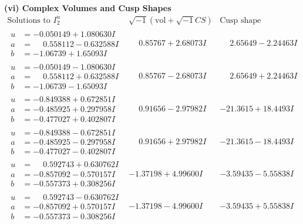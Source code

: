 \documentclass[1p]{elsarticle_modified}
\theoremstyle{definition}
\newcommand{\I}{\sqrt{-1}}
\begin{document}
\newpage\flushleft \textbf{(vi) Complex Volumes and Cusp Shapes}
$$\begin{array}{c|c|c}  
\text{Solutions to }I^u_{2}& \I (\text{vol} + \sqrt{-1}CS) & \text{Cusp shape}\\
 \hline 
\begin{aligned}
u &= -0.050149 + 1.080630 I \\
a &= \phantom{-}0.558112 - 0.632588 I \\
b &= -1.06739 + 1.65093 I\end{aligned}
 & \phantom{-}0.85767 + 2.68073 I & \phantom{-}2.65649 - 2.24463 I \\ \hline\begin{aligned}
u &= -0.050149 - 1.080630 I \\
a &= \phantom{-}0.558112 + 0.632588 I \\
b &= -1.06739 - 1.65093 I\end{aligned}
 & \phantom{-}0.85767 - 2.68073 I & \phantom{-}2.65649 + 2.24463 I \\ \hline\begin{aligned}
u &= -0.849388 + 0.672851 I \\
a &= -0.485925 + 0.297958 I \\
b &= -0.477027 + 0.402807 I\end{aligned}
 & \phantom{-}0.91656 - 2.97982 I & -21.3615 + 18.4493 I \\ \hline\begin{aligned}
u &= -0.849388 - 0.672851 I \\
a &= -0.485925 - 0.297958 I \\
b &= -0.477027 - 0.402807 I\end{aligned}
 & \phantom{-}0.91656 + 2.97982 I & -21.3615 - 18.4493 I \\ \hline\begin{aligned}
u &= \phantom{-}0.592743 + 0.630762 I \\
a &= -0.857092 - 0.570157 I \\
b &= -0.557373 + 0.308256 I\end{aligned}
 & -1.37198 + 4.99600 I & -3.59435 - 5.55838 I \\ \hline\begin{aligned}
u &= \phantom{-}0.592743 - 0.630762 I \\
a &= -0.857092 + 0.570157 I \\
b &= -0.557373 - 0.308256 I\end{aligned}
 & -1.37198 - 4.99600 I & -3.59435 + 5.55838 I \\ \hline\begin{aligned}

\end{aligned}
\end{array}$$
\end{document}

